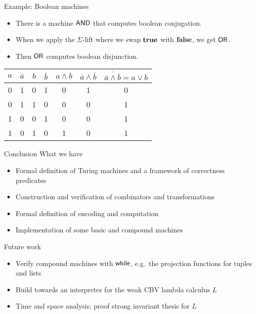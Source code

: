 \begin{frame}{Example: Boolean machines}
  \begin{itemize}
    \item There is a machine $\textsf{AND}$ that computes boolean conjugation.
    \item When we apply the $\Sigma$-lift where we swap $\mathbf{true}$ with $\mathbf{false}$, we get $\textsf{OR}$.
    \item Then $\textsf{OR}$ computes boolean disjunction.
  \end{itemize}
  \begin{table}
    \begin{tabular}{|cc|cc|c|c|c|}
      \hline
      $a$ & $\bar{a}$ & $b$ & $\bar{b}$ & $a\land b$ & $\bar{a}\land\bar{b}$ & $\overline{\bar{a}\land\bar{b}}=a\lor b$\tabularnewline
      \hline
      0 & 1 & 0 & 1 & 0 & 1 & 0\tabularnewline
      0 & 1 & 1 & 0 & 0 & 0 & 1\tabularnewline
      1 & 0 & 0 & 1 & 0 & 0 & 1\tabularnewline
      1 & 0 & 1 & 0 & 1 & 0 & 1\tabularnewline
      \hline
    \end{tabular}
  \end{table}
\end{frame}


\begin{frame}{Conclusion}
  What we have
  \begin{itemize}
    \item Formal definition of Turing machines and a framework of correctness predicates
    \item Construction and verification of combinators and transformations
    \item Formal definition of encoding and computation
    \item Implementation of some basic and compound machines
  \end{itemize}

  Future work
  \begin{itemize}
    \item Verify compound machines with $\textsf{while}$, e.g.\ the projection functions for tuples and lists
    \item Build towards an interpreter for the weak CBV lambda calculus $L$
    \item Time and space analysis; proof strong invariant thesis for $L$
  \end{itemize}
\end{frame}

\appendix %

